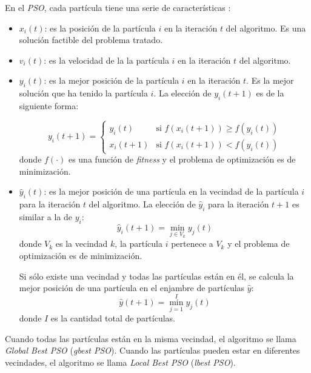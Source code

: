     En el \emph{PSO}, cada partícula tiene una serie de características
\cite{PSO_0}:
\begin{itemize}
    \item $x_i(t)$: es la posición de la partícula $i$ en la iteración $t$ del
algoritmo. Es una solución factible del problema tratado.
    \item $v_i(t)$: es la velocidad de la la partícula $i$ en la iteración $t$
del algoritmo.
    \item $y_i(t)$: es la mejor posición de la partícula $i$ en la iteración $t$.
Es la mejor solución que ha tenido la partícula $i$. La elección de $y_i(t+1)$
es de la siguiente forma:

\begin{equation}\label{pso: yi}
      y_i(t+1) =
      \begin{cases}
        y_i(t)   & \text{si } f(x_i(t+1)) \geq f(y_i(t)) \\
        x_i(t+1) & \text{si } f(x_i(t+1)) < f(y_i(t))
      \end{cases}
\end{equation}
donde $f(\cdot)$ es una función de \emph{fitness} y el problema de optimización
es de minimización.
    \item $\hat{y}_i(t)$: es la mejor posición de una partícula en la vecindad de
la partícula $i$ para la iteración $t$ del algoritmo. La elección de $\hat{y}_i$
para la iteración $t + 1$ es similar a la de $y_i$:
\begin{equation}\label{pso: hatyi}
    \hat{y}_i(t + 1) = \displaystyle\min_{j \in V_k} y_j(t)
\end{equation}
donde $V_k$ es la vecindad $k$, la partícula $i$ pertenece a $V_k$ y el
problema de optimización es de minimización.

    Si sólo existe una vecindad y todas las partículas están en él, se calcula
la mejor posición de una partícula en el enjambre de partículas $\hat{y}$:
\begin{equation}\label{pso: haty}
    \hat{y}(t + 1) = \displaystyle\min_{j = 1}^{I} y_j(t)
\end{equation}
donde $I$ es la cantidad total de partículas.
\end{itemize}

    Cuando todas las partículas están en la misma vecindad, el algoritmo se
llama \emph{Global Best PSO} (\emph{gbest PSO}). Cuando las partículas pueden
estar en diferentes vecindades, el algoritmo se llama \emph{Local Best PSO}
(\emph{lbest PSO}).


